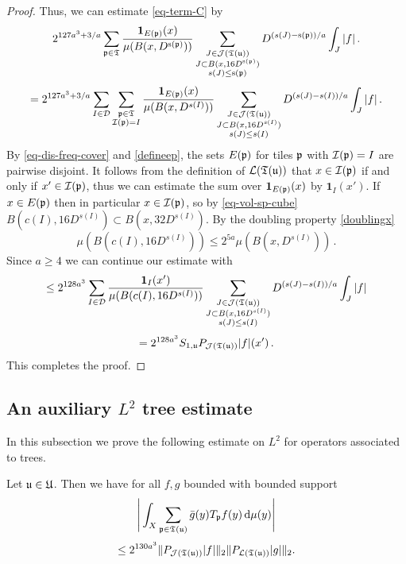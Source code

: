 \begin{proof}
    Thus, we can estimate \eqref{eq-term-C} by
    $$
        2^{127a^3 + 3/a}\sum_{{\mathfrak p}\in \mathfrak{T}}\frac{\mathbf{1}_{E({\mathfrak p})}(x)}{\mu(B(x,D^{{\mathrm{s}}({\mathfrak p})}))}\sum_{\substack{J\in \mathcal{J}({\mathfrak T}({\mathfrak u}))\\J\subset B(x, 16D^{{\mathrm{s}}({\mathfrak p})})\\ s(J) \le {\mathrm{s}}({\mathfrak p})}} D^{(s(J) - {\mathrm{s}}({\mathfrak p}))/a} \int_J |f|\,.
    $$
    $$
        = 2^{127a^3 + 3/a}\sum_{I \in \mathcal{D}} \sum_{\substack{{\mathfrak p}\in \mathfrak{T}\\ {\mathcal{I}}({\mathfrak p}) = I}}\frac{\mathbf{1}_{E({\mathfrak p})}(x)}{\mu(B(x, D^{s(I)}))}\sum_{\substack{J\in \mathcal{J}({\mathfrak T}({\mathfrak u}))\\J\subset B(x, 16 D^{s(I)})\\ s(J) \le s(I)}} D^{(s(J) - s(I))/a} \int_J |f|\,.
    $$
    By \eqref{eq-dis-freq-cover} and \eqref{defineep}, the sets $E({\mathfrak p})$ for tiles ${\mathfrak p}$ with ${\mathcal{I}}({\mathfrak p}) = I$ are pairwise disjoint. It follows from the definition of $\mathcal{L}({\mathfrak T}({\mathfrak u}))$ that $x \in {\mathcal{I}}({\mathfrak p})$ if and only if $x' \in {\mathcal{I}}({\mathfrak p})$, thus we can estimate the sum over $\mathbf{1}_{E({\mathfrak p})}(x)$ by $\mathbf{1}_{I}(x')$.
    If $x \in E({\mathfrak p})$ then in particular $x \in {\mathcal{I}}({\mathfrak p})$, so by \eqref{eq-vol-sp-cube} $B(c(I),16D^{s(I)}) \subset B(x, 32D^{s(I)})$. By the doubling property \eqref{doublingx}
    $$
        \mu(B(c(I), 16D^{s(I)})) \le 2^{5a} \mu(B(x, D^{s(I)}))\,.
    $$
    Since $a \ge 4$ we can continue our estimate with
    $$
        \le 2^{128a^3}\sum_{I \in \mathcal{D}} \frac{\mathbf{1}_{I}(x')}{\mu(B(c(I), 16D^{s(I)}))}\sum_{\substack{J\in \mathcal{J}({\mathfrak T}({\mathfrak u}))\\J\subset B(x, 16 D^{s(I)})\\ s(J) \le s(I)}} D^{(s(J) - s(I))/a} \int_J |f|
    $$
    $$
         = 2^{128a^3} S_{1,{\mathfrak u}} P_{\mathcal{J}({\mathfrak T}({\mathfrak u}))}|f|(x')\,.
    $$
    This completes the proof.
\end{proof}

\subsection{An auxiliary \texorpdfstring{$L^2$}{L2} tree estimate}

In this subsection we prove the following estimate on $L^2$ for operators associated to trees.

\begin{lemma}
    \label{tree-projection-estimate}
    \leanok
    Let ${\mathfrak u} \in {\mathfrak U}$.
    Then we have for all $f, g$ bounded with bounded support
    $$
        \Bigg|\int_X \sum_{{\mathfrak p} \in {\mathfrak T}({\mathfrak u})} \bar g(y) T_{{\mathfrak p}}f(y) \, \mathrm{d}\mu(y) \Bigg|
    $$
    \begin{equation}
        \label{eq-tree-est}
         \le 2^{130a^3}\|P_{\mathcal{J}({\mathfrak T}({\mathfrak u}))}|f|\|_{2}\|P_{\mathcal{L}({\mathfrak T}({\mathfrak u}))}|g|\|_{2}.
    \end{equation}
\end{lemma}

